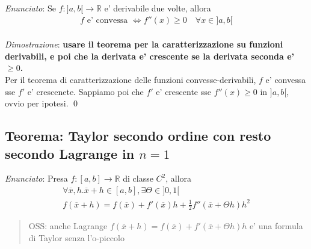 \documentclass{article}
\begin{document}
\emph{Enunciato}: Se $f: ]a,b[ \to \mathbb{R}$ e' derivabile due volte, allora
\begin{align*}
  f \text{ e' convessa } \iff f''(x) \geq 0 \quad \forall x \in ]a,b[
\end{align*} \\

\noindent\emph{Dimostrazione}: \textbf{usare il teorema per la caratterizzazione
su funzioni derivabili, e poi che la derivata e' crescente se la derivata seconda e' $\geq 0$.} \\
Per il teorema di caratterizzazione delle funzioni convesse-derivabili, $f$ e'
convessa sse $f'$ e' crescenete. Sappiamo poi che $f'$ e' crescente sse $f''(x) \geq 0$
in $]a,b[$, ovvio per ipotesi. \qed

\subsection{Teorema: Taylor secondo ordine con resto secondo Lagrange in $n=1$}

\emph{Enunciato}: Presa $f: [a, b] \to \mathbb{R}$ di classe $C^2$, allora
\begin{align*}
  \forall \overline{x}, h. \overline{x} + h \in [a,b], \exists \Theta \in ]0,1[ \\
  f(\overline{x} + h) = f(\overline{x}) + f'(\overline{x})h + \frac{1}{2}f''(\overline{x}+\Theta h) h^2
\end{align*}

\begin{quote}
  OSS: anche Lagrange $f(\overline{x} + h) = f(\overline{x}) + f'(\overline{x} + \Theta h)h$ 
  e' una formula di Taylor senza l'o-piccolo
\end{quote}
\end{document}
